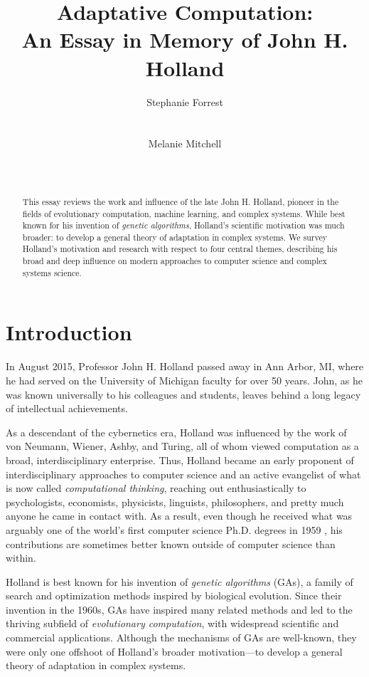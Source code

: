 \documentclass{sig-alternate}
\title{Adaptative Computation:\\ An Essay in Memory of John
  H. Holland}
\author 
{\alignauthor
 Stephanie Forrest\\
 \affaddr{University of New Mexico}\\
 \affaddr{Santa Fe Institute}\\
 \email{forrest@cs.unm.edu}
 \alignauthor
Melanie Mitchell \\
 \affaddr{Portland State University}\\
 \affaddr{Santa Fe Institute}\\
 \email{mm@pdx.edu}
}
\begin{document}
\maketitle

\begin{abstract}
This essay reviews the work and influence of the late John H. Holland,
pioneer in the fields of evolutionary computation, machine learning,
and complex systems.  While best known for his invention of
\emph{genetic algorithms}, Holland's scientific motivation was much
broader:  to develop a general theory of adaptation in complex
systems.  We survey Holland's motivation and research with respect to
four central themes, describing his broad and deep influence on modern approaches to computer science and complex systems science.  
\end{abstract}

\section{Introduction}

In August 2015, Professor John H. Holland passed away in Ann Arbor, MI, where
he had served on the University of Michigan faculty for over 50 years.
John, as he was known universally to his colleagues and students,
leaves behind a long legacy of intellectual achievements.

As a descendant of the cybernetics era, Holland was 
influenced by the work of von Neumann, Wiener, Ashby, and Turing, all
of whom viewed computation as a broad, interdisciplinary enterprise.
Thus, Holland became an early proponent of interdisciplinary
approaches to computer science and an active evangelist of what is now
called \emph{computational thinking}, reaching out enthusiastically to
psychologists, economists, physicists, linguists, philosophers, and
pretty much anyone he came in contact with.  As a result, even though
he received what was arguably one of the world's first computer
science
Ph.D. degrees in 1959 \cite{London2003}, his contributions are sometimes better known outside of
computer science than within.

Holland is best known for his invention of \emph{genetic
  algorithms} (GAs), a family of search and optimization methods inspired
by biological evolution.  Since their invention in the 1960s, GAs have
inspired many related methods and led to the thriving subfield of
\emph{evolutionary computation}, with widespread scientific and
commercial applications.  Although the mechanisms of GAs are well-known,
they were only one
offshoot of Holland's broader motivation---to develop a general
theory of adaptation in complex systems.  
\end{document}
